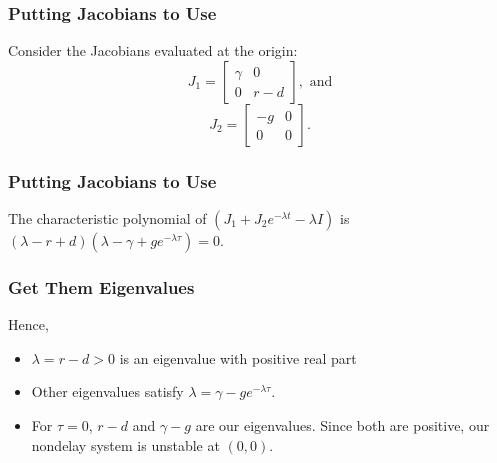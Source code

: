 \documentclass{beamer}
\begin{document}

\begin{frame}\frametitle{Putting Jacobians to Use}
Consider the Jacobians evaluated at the origin:$$J_1=\begin{bmatrix}
\gamma & 0\\
0 & r-d
\end{bmatrix}, \text{ and}$$ $$J_2=\begin{bmatrix}
-g & 0\\
0 & 0
\end{bmatrix}.$$ 
\end{frame}


\begin{frame}[c]\frametitle{Putting Jacobians to Use}
The characteristic polynomial of $(J_1+J_2e^{-\lambda t} -\lambda I)$ is $(\lambda - r + d)(\lambda -\gamma + ge^{-\lambda\tau})=0$. 
\end{frame}

\begin{frame}\frametitle{Get Them Eigenvalues}
Hence, \begin{itemize}{\itemsep .5in}\item $\lambda = r-d>0$ is an eigenvalue with positive real part\item Other eigenvalues satisfy $\lambda=\gamma-ge^{-\lambda\tau}$. \item For $\tau=0$, $r-d$ and $\gamma - g$ are our eigenvalues. Since both are positive, our nondelay system is unstable at $(0,0)$. \end{itemize}

\end{frame}
\end{document}
